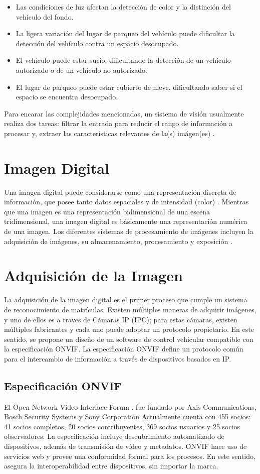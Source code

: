 \begin{itemize}
    \item Las condiciones de luz afectan la detección de color y la distinción del vehículo del fondo.
    \item La ligera variación del lugar de parqueo del vehículo puede dificultar la detección del vehículo contra un espacio desocupado. 
    \item El vehículo puede estar sucio, dificultando la detección de un vehículo autorizado o de un vehículo no autorizado. 
    \item El lugar de parqueo puede estar cubierto de nieve, dificultando saber si el espacio se encuentra desocupado.
\end{itemize}
Para encarar las complejidades mencionadas, un sistema de visión usualmente realiza dos tareas: filtrar la entrada para reducir el rango de información a procesar y, extraer las características relevantes de la(s) imágen(es) \cite{Demaagd2012-qb}.

\section{Imagen Digital}
Una imagen digital puede considerarse como una representación discreta de información, que posee tanto datos espaciales y de intensidad (color) \cite{Solomon2011-xz}.
Mientras que una imagen es una representación bidimensional de una escena tridimensional, una imagen digital es básicamente una representación numérica de una imagen. Los diferentes sistemas de procesamiento de imágenes incluyen la adquisición de imágenes, su almacenamiento, procesamiento y exposición \cite{Jayaraman2011-jb}.
\section{Adquisición de la Imagen}
La adquisición de la imagen digital es el primer proceso que cumple un sistema de reconocimiento de matrículas. Existen múltiples maneras de adquirir imágenes, y uno de ellos es a traves de Cámaras IP (IPC); para estas cámaras, existen múltiples fabricantes y cada uno puede adoptar un protocolo propietario. En este sentido, se propone un diseño de un software de control vehicular compatible con la especificación ONVIF. La especificación ONVIF define un protocolo común para el intercambio de información a través de dispositivos basados en IP. 

\subsection{Especificación ONVIF}
El Open Network Video Interface Forum \cite{Onvif2016-bt}. fue fundado por Axis Communications, Bosch Security Systems y Sony Corporation Actualmente cuenta con 455 socios: 41 socios completos, 20 socios contribuyentes, 369 socios usuarios y 25 socios observadores. La especificación incluye descubrimiento automatizado de  dispositivos,  además de  transmisión de vídeo y metadatos. ONVIF hace uso de servicios web y provee una conformidad formal para los procesos. En este sentido, asegura la interoperabilidad entre dispositivos, sin importar la marca. 


